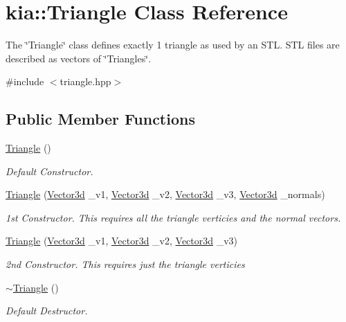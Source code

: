 \hypertarget{classkia_1_1Triangle}{\section{kia\-:\-:Triangle Class Reference}
\label{classkia_1_1Triangle}
}


The \char`\"{}\-Triangle\char`\"{} class defines exactly 1 triangle as used by an S\-T\-L. S\-T\-L files are described as vectors of \char`\"{}\-Triangles\char`\"{}.  




{\ttfamily \#include $<$triangle.\-hpp$>$}

\subsection*{Public Member Functions}
\begin{DoxyCompactItemize}
\item 
\hyperlink{classkia_1_1Triangle_a217a19d365f1b86ff99cb438bf6bd394}{Triangle} ()
\begin{DoxyCompactList}\small\item\em Default Constructor. \end{DoxyCompactList}\item 
\hyperlink{classkia_1_1Triangle_abaab979950df7c96fc29b838f61516d7}{Triangle} (\hyperlink{classkia_1_1Vector3d}{Vector3d} \-\_\-v1, \hyperlink{classkia_1_1Vector3d}{Vector3d} \-\_\-v2, \hyperlink{classkia_1_1Vector3d}{Vector3d} \-\_\-v3, \hyperlink{classkia_1_1Vector3d}{Vector3d} \-\_\-normals)
\begin{DoxyCompactList}\small\item\em 1st Constructor. This requires all the triangle verticies and the normal vectors. \end{DoxyCompactList}\item 
\hyperlink{classkia_1_1Triangle_a5b29d14dfd6ddf5b10309fe6aa906a6d}{Triangle} (\hyperlink{classkia_1_1Vector3d}{Vector3d} \-\_\-v1, \hyperlink{classkia_1_1Vector3d}{Vector3d} \-\_\-v2, \hyperlink{classkia_1_1Vector3d}{Vector3d} \-\_\-v3)
\begin{DoxyCompactList}\small\item\em 2nd Constructor. This requires just the triangle verticies \end{DoxyCompactList}\item 
\hyperlink{classkia_1_1Triangle_ac6e427fabad21930b13cf693dfe6a6c9}{$\sim$\-Triangle} ()
\begin{DoxyCompactList}\small\item\em Default Destructor. \end{DoxyCompactList}\end{DoxyCompactItemize}
